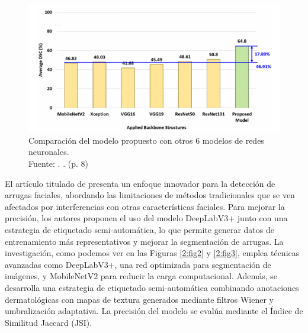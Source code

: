 \begin{figure}[!ht]
	\begin{center}
		\includegraphics[width=1\textwidth]{2/figures/resultados de cuarto anteedente.png}
		\caption[Comparación del modelo propuesto con otros 6 modelos de redes neuronales]{Comparación del modelo propuesto con otros 6 modelos de redes neuronales.\\
			Fuente: \cite{Kim2023}. . (p. 8)}
		\label{2:fig1}
	\end{center}
\end{figure}


El artículo titulado  de \cite{Zhong2024} presenta un enfoque innovador para la detección de arrugas faciales, abordando las limitaciones de métodos tradicionales que se ven afectados por interferencias con otras características faciales. Para mejorar la precisión, los autores proponen el uso del modelo DeepLabV3+ junto con una estrategia de etiquetado semi-automática, lo que permite generar datos de entrenamiento más representativos y mejorar la segmentación de arrugas.
La investigación, como podemos ver en las Figuras \ref{2:fig2} y \ref{2:fig3}, emplea técnicas avanzadas como DeepLabV3+, una red optimizada para segmentación de imágenes, y MobileNetV2 para reducir la carga computacional. Además, se desarrolla una estrategia de etiquetado semi-automática combinando anotaciones dermatológicas con mapas de textura generados mediante filtros Wiener y umbralización adaptativa. La precisión del modelo se evalúa mediante el Índice de Similitud Jaccard (JSI).

